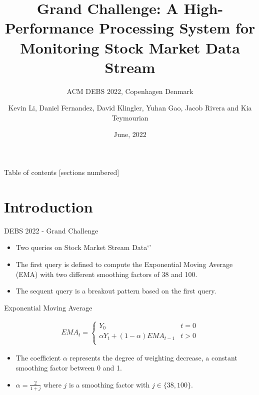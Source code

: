 \documentclass[9pt]{beamer}
\title{Grand Challenge: A High-Performance Processing System for Monitoring Stock Market Data Stream}
\subtitle{ACM  DEBS 2022, Copenhagen Denmark}
\date{June, 2022}
\author{\footnotesize{Kevin Li, Daniel Fernandez, David Klingler, Yuhan Gao, Jacob Rivera and Kia Teymourian}}
\institute{The University of Texas at Austin}
\begin{document}
\maketitle





\begin{frame}{Table of contents}
  [sections numbered]
 \tableofcontents[hideallsubsections]
\end{frame}



\section{Introduction}

\begin{frame}[fragile]{DEBS 2022 - Grand Challenge }

\begin{itemize}
    \item Two queries on Stock Market Stream Data`'
    \item The first query is defined to compute the Exponential Moving Average (EMA) with two different smoothing factors of 38 and 100.
    \item The sequent query is a breakout pattern based on the first query. 
\end{itemize}
    
\end{frame}

\begin{frame}[fragile]{Exponential Moving Average }
    
    \begin{align*}
        EMA_t = \begin{cases}
            Y_0 &  t = 0 \\
            \alpha Y_t + (1-\alpha) EMA_{t-1}& t>0 \\
            \end{cases}
    \end{align*}
    
    \begin{itemize}
        \item The coefficient $\alpha$ represents the degree of weighting decrease, a constant smoothing factor between 0 and 1.
        \item $\alpha = \frac{2}{1+j}$ where $j$ is a smoothing factor with $j \in \{38, 100 \}$.
    \end{itemize}
    
    
\end{frame}
\end{document}

